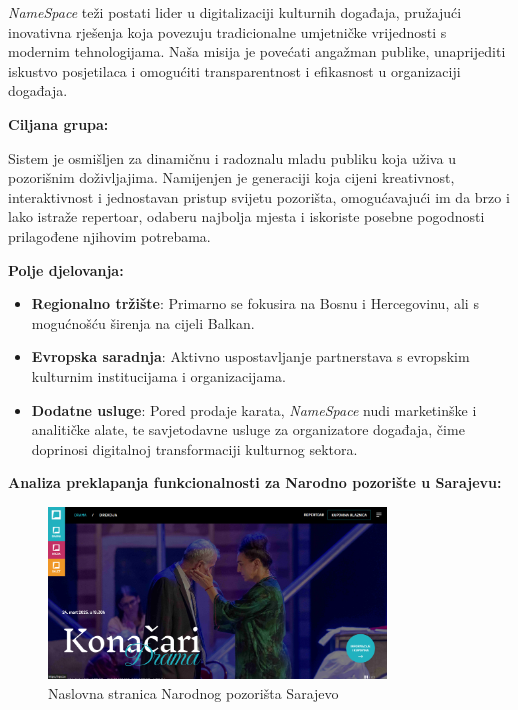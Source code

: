 \indent\textit{NameSpace} teži postati lider u digitalizaciji kulturnih događaja, pružajući inovativna rješenja koja povezuju tradicionalne umjetničke vrijednosti s modernim tehnologijama. Naša misija je povećati angažman publike, unaprijediti iskustvo posjetilaca i omogućiti transparentnost i efikasnost u organizaciji događaja. 

\noindent\textbf{Ciljana grupa:}

Sistem je osmišljen za dinamičnu i radoznalu mladu publiku koja uživa u pozorišnim doživljajima. Namijenjen je generaciji koja cijeni kreativnost, interaktivnost i jednostavan pristup svijetu pozorišta, omogućavajući im da brzo i lako istraže repertoar, odaberu najbolja mjesta i iskoriste posebne pogodnosti prilagođene njihovim potrebama.

\noindent\textbf{Polje djelovanja:}
\vspace{-0.5em}
\begin{itemize}
  \item \textbf{Regionalno tržište}:
  Primarno se fokusira na Bosnu i Hercegovinu, ali s mogućnošću širenja na cijeli Balkan.
  \item \textbf{Evropska saradnja}:
  Aktivno uspostavljanje partnerstava s evropskim kulturnim institucijama i organizacijama.
  \item \textbf{Dodatne usluge}:
  Pored prodaje karata, \textit{NameSpace} nudi marketinške i analitičke alate, te savjetodavne usluge za organizatore događaja, čime doprinosi digitalnoj transformaciji kulturnog sektora.
\end{itemize}

\newpage

\noindent\textbf{Analiza preklapanja funkcionalnosti za Narodno pozorište u Sarajevu:}
\begin{figure}[H]
    \centering
    \includegraphics[width=0.8\textwidth]{Slike/narodnoPozoriste1.png}
    \caption{Naslovna stranica Narodnog pozorišta Sarajevo}
    \label{fig:np1}
\end{figure}

